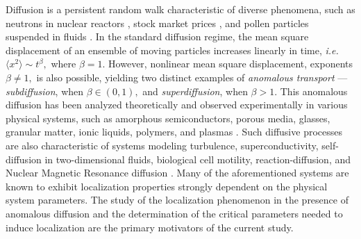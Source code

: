 \documentclass[final,1p,times]{elsarticle}
\theoremstyle{remark}
\theoremstyle{definition}
\begin{document}
Diffusion is a persistent random walk characteristic of diverse phenomena, such as neutrons in nuclear reactors \cite{osti_4074688}, stock market prices \cite{bachelier2011louis}, and pollen particles suspended in fluids \cite{nelson1967dynamical}. In the standard diffusion regime, the mean square displacement of an ensemble of moving particles increases linearly in time, {\em i.e.} $\langle x^2\rangle \sim t^\beta,$ where $\beta=1.$ However, nonlinear mean square displacement, exponents $\beta\neq 1,$ is also possible, yielding two distinct examples of {\em anomalous transport} --- {\em subdiffusion}, when $\beta\in(0,1),$ and {\em superdiffusion}, when $\beta>1.$ This anomalous diffusion has been analyzed theoretically and observed experimentally in various physical systems, such as amorphous semiconductors, porous media, glasses, granular matter, ionic liquids, polymers, and plasmas \cite{shlesinger1993strange,bouchaud1990anomalous,0305-4470-37-31-R01,metzler2000random,10.1007/BFb0106838,binder1999anomalous}. Such diffusive processes are also characteristic of systems modeling turbulence, superconductivity, self-diffusion in two-dimensional fluids, biological cell motility, reaction-diffusion, and Nuclear Magnetic Resonance diffusion \cite{binder1999anomalous,korabel2005understanding,hansen1999dispersion,1367-2630-19-12-123038,UPADHYAYA2001549,droz1999fronts,palombo2013structural}. 
Many of the aforementioned systems are known to exhibit localization properties strongly dependent on the  physical system parameters. 
The study of the localization phenomenon in the presence of anomalous diffusion and the determination of the critical parameters needed to induce localization are the primary motivators of the current study.
\end{document}
